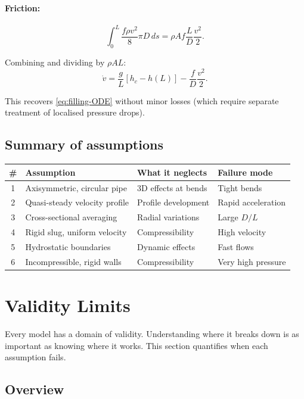 \documentclass[11pt]{article}
\begin{document}
\paragraph{Friction:}
\[
  \int_0^L \frac{f\rho v^2}{8}\pi D \, ds = \rho A f \frac{L}{D}\frac{v^2}{2}.
\]

Combining and dividing by $\rho A L$:
\[
  \dot{v} = \frac{g}{L}[h_c - h(L)] - \frac{f}{D}\frac{v^2}{2}.
\]

This recovers \eqref{eq:filling-ODE} without minor losses (which require separate treatment of localised pressure drops).

\subsection{Summary of assumptions}

\begin{center}
\renewcommand{\arraystretch}{1.3}
\begin{tabular}{clll}
\toprule
\# & Assumption & What it neglects & Failure mode \\
\midrule
1 & Axisymmetric, circular pipe & 3D effects at bends & Tight bends \\
2 & Quasi-steady velocity profile & Profile development & Rapid acceleration \\
3 & Cross-sectional averaging & Radial variations & Large $D/L$ \\
4 & Rigid slug, uniform velocity & Compressibility & High velocity \\
5 & Hydrostatic boundaries & Dynamic effects & Fast flows \\
6 & Incompressible, rigid walls & Compressibility & Very high pressure \\
\bottomrule
\end{tabular}
\end{center}

\section{Validity Limits}
\label{sec:validity}

Every model has a domain of validity. Understanding where it breaks down is as important as knowing where it works. This section quantifies when each assumption fails.

\subsection{Overview}
\end{document}
